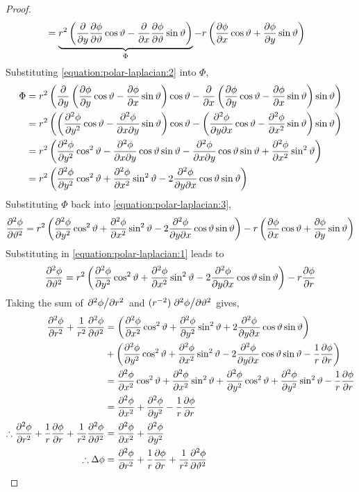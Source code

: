 \begin{lemma}
\begin{proof}
\begin{align}
            \label{equation:polar-laplacian:3}&=\underbrace{r^2\left(\pdv{y}\pdv{\phi}{\vartheta}\cos\vartheta-\pdv{x}\pdv{\phi}{\vartheta}\sin\vartheta\right)}_{\Phi}-r\left(\pdv{\phi}{x}\cos\vartheta+\pdv{\phi}{y}\sin\vartheta\right)
        \end{align}
        Substituting \eqref{equation:polar-laplacian:2} into $\Phi$,
        \begin{align*}
            \Phi&=r^2\left(\pdv{y}\left(\pdv{\phi}{y}\cos\vartheta-\pdv{\phi}{x}\sin\vartheta\right)\cos\vartheta-\pdv{x}\left(\pdv{\phi}{y}\cos\vartheta-\pdv{\phi}{x}\sin\vartheta\right)\sin\vartheta\right)\\
            &=r^2\left(\left(\pdv[2]{\phi}{y}\cos\vartheta-\pdv{\phi}{x}{y}\sin\vartheta\right)\cos\vartheta-\left(\pdv{\phi}{y}{x}\cos\vartheta-\pdv[2]{\phi}{x}\sin\vartheta\right)\sin\vartheta\right)\\
            &=r^2\left(\pdv[2]{\phi}{y}\cos^2\vartheta-\pdv{\phi}{x}{y}\cos\vartheta\sin\vartheta-\pdv{\phi}{x}{y}\cos\vartheta\sin\vartheta+\pdv[2]{\phi}{x}\sin^2\vartheta\right)\\
            &=r^2\left(\pdv[2]{\phi}{y}\cos^2\vartheta+\pdv[2]{\phi}{x}\sin^2\vartheta-2\pdv{\phi}{y}{x}\cos\vartheta\sin\vartheta\right)
        \end{align*}
        Substituting $\Phi$ back into \eqref{equation:polar-laplacian:3},
        $$
            \pdv[2]{\phi}{\vartheta}=r^2\left(\pdv[2]{\phi}{y}\cos^2\vartheta+\pdv[2]{\phi}{x}\sin^2\vartheta-2\pdv{\phi}{y}{x}\cos\vartheta\sin\vartheta\right)-r\left(\pdv{\phi}{x}\cos\vartheta+\pdv{\phi}{y}\sin\vartheta\right)
        $$
        Substituting in \eqref{equation:polar-laplacian:1} leads to
        $$
            \pdv[2]{\phi}{\vartheta}=r^2\left(\pdv[2]{\phi}{y}\cos^2\vartheta+\pdv[2]{\phi}{x}\sin^2\vartheta-2\pdv{\phi}{y}{x}\cos\vartheta\sin\vartheta\right)-r\pdv{\phi}{r}
        $$
        Taking the sum of $\pdv*[2]{\phi}{r}$ and $(r^{-2})\pdv*[2]{\phi}{\vartheta}$ gives,
        \begin{align*}
            \pdv[2]{\phi}{r}+\frac{1}{r^2}\pdv[2]{\phi}{\vartheta}&=\left(\pdv[2]{\phi}{x}\cos^2\vartheta+\pdv[2]{\phi}{y}\sin^2\vartheta+2\pdv{\phi}{y}{x}\cos\vartheta\sin\vartheta\right)\\
            &+\left(\pdv[2]{\phi}{y}\cos^2\vartheta+\pdv[2]{\phi}{x}\sin^2\vartheta-2\pdv{\phi}{y}{x}\cos\vartheta\sin\vartheta-\frac{1}{r}\pdv{\phi}{r}\right)\\
            &=\pdv[2]{\phi}{x}\cos^2\vartheta+\pdv[2]{\phi}{x}\sin^2\vartheta+\pdv[2]{\phi}{y}\cos^2\vartheta+\pdv[2]{\phi}{y}\sin^2\vartheta-\frac{1}{r}\pdv{\phi}{r}\\
            &=\pdv[2]{\phi}{x}+\pdv[2]{\phi}{y}-\frac{1}{r}\pdv{\phi}{r}\\
            \therefore\pdv[2]{\phi}{r}+\frac{1}{r}\pdv{\phi}{r}+\frac{1}{r^2}\pdv[2]{\phi}{\vartheta}&=\pdv[2]{\phi}{x}+\pdv[2]{\phi}{y}\\
            \therefore\Delta\phi&=\pdv[2]{\phi}{r}+\frac{1}{r}\pdv{\phi}{r}+\frac{1}{r^2}\pdv[2]{\phi}{\vartheta}
        \end{align*}
    \end{proof}
\end{lemma}

